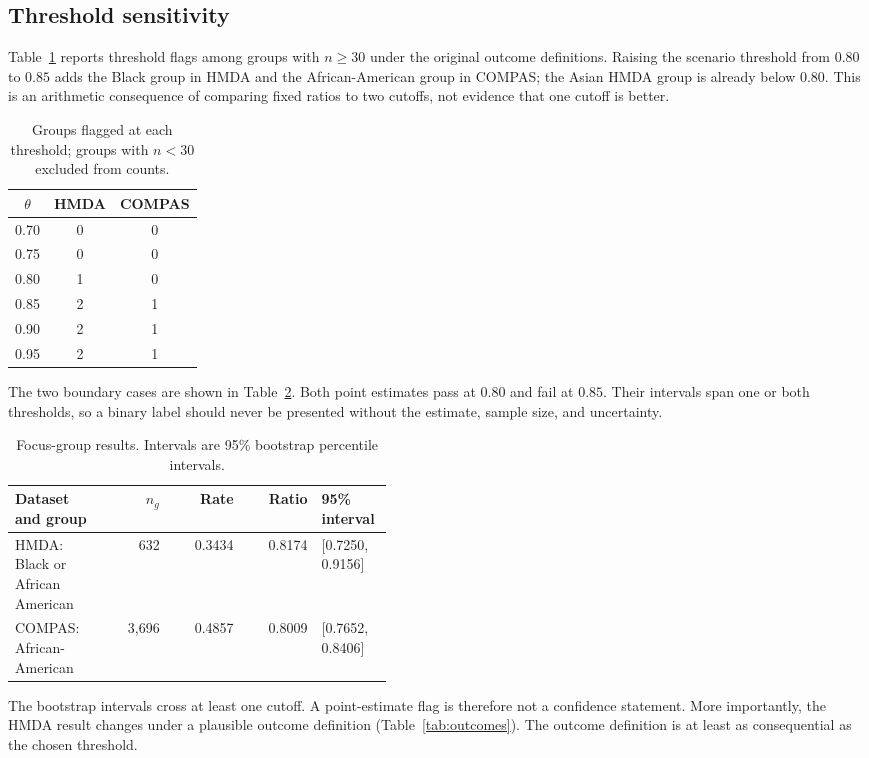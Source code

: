 \documentclass[10pt]{article}
\begin{document}
\subsection{Threshold sensitivity}

Table~\ref{tab:sweep} reports threshold flags among groups with $n\geq30$
under the original outcome definitions. Raising the scenario threshold from
$0.80$ to $0.85$ adds the Black group in HMDA and the African-American group in
COMPAS; the Asian HMDA group is already below $0.80$. This is an arithmetic
consequence of comparing fixed ratios to two cutoffs, not evidence that one
cutoff is better.

\begin{table}[ht]
\centering
\caption{Groups flagged at each threshold; groups with $n<30$ excluded from
counts.}
\label{tab:sweep}
\begin{tabular}{ccc}
\toprule
$\theta$ & HMDA & COMPAS \\
\midrule
0.70 & 0 & 0 \\
0.75 & 0 & 0 \\
0.80 & 1 & 0 \\
0.85 & 2 & 1 \\
0.90 & 2 & 1 \\
0.95 & 2 & 1 \\
\bottomrule
\end{tabular}
\end{table}

The two boundary cases are shown in Table~\ref{tab:focus}. Both point estimates
pass at $0.80$ and fail at $0.85$. Their intervals span one or both thresholds,
so a binary label should never be presented without the estimate, sample size,
and uncertainty.

\begin{table}[ht]
\centering
\caption{Focus-group results. Intervals are 95\% bootstrap percentile
intervals.}
\label{tab:focus}
\begin{tabular}{p{0.25\linewidth}rrrp{0.19\linewidth}}
\toprule
Dataset and group & $n_g$ & Rate & Ratio & 95\% interval \\
\midrule
HMDA: Black or African American & 632 & 0.3434 & 0.8174 & [0.7250, 0.9156] \\
COMPAS: African-American & 3,696 & 0.4857 & 0.8009 & [0.7652, 0.8406] \\
\bottomrule
\end{tabular}
\end{table}

The bootstrap intervals cross at least one cutoff. A point-estimate flag is
therefore not a confidence statement. More importantly, the HMDA result
changes under a plausible outcome definition (Table~\ref{tab:outcomes}). The
outcome definition is at least as consequential as the chosen threshold.
\end{document}
